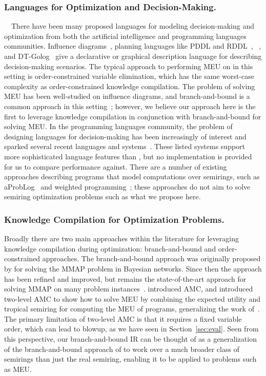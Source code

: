 \subsubsection*{Languages for Optimization and Decision-Making.}~~There have been many
proposed languages for modeling decision-making and optimization from both the
artificial intelligence and programming languages communities.
Influence
diagrams~\citep{khaled2013solving,maua2016equivalences},
planning languages like PDDL and RDDL~\citep{sanner2010relational},
\dtproblog{}~\citep{van2010dtproblog}, and DT-Golog~\citep{boutilierdecision} give
a declarative or graphical description language for describing decision-making
scenarios. The typical approach to performing MEU on in this setting is
order-constrained variable elimination, which has the same worst-case complexity
as order-constrained knowledge compilation.  The problem of solving MEU has been
well-studied on influence diagrams, and branch-and-bound is a common approach in
this setting~\citep{yuan2012solving}; however, we believe our approach here is
the first to leverage knowledge compilation in conjunction with branch-and-bound
for solving MEU.  In the programming languages community, the problem of
designing languages for decision-making has been increasingly of interest and
sparked several recent languages and
systems~\citep{abadi2021smart,lago2022reinforcement}. These listed systems
support more sophisticated language features than \dappl{}, but no
implementation is provided for us to compare performance against.  There are a
number of existing approaches describing programs that model computations over semirings, such as
aProbLog~\citep{kimmig2011algebraic,kimmig2017algebraic} and weighted
programming~\citep{batz2022weighted}; these approaches do not aim to solve
semiring optimization problems such as what we propose here.

\subsubsection*{Knowledge Compilation for Optimization Problems.}
Broadly there are two main approaches within the literature for leveraging
knowledge compilation during optimization: branch-and-bound and
order-constrained approaches. The branch-and-bound approach was
originally proposed by \citet{huang2006solving} for solving the MMAP
problem in Bayesian networks.  Since then the approach has been refined and
improved, but remains the state-of-the-art approach for solving
MMAP on many problem
instances~\citep{choi2022solving,conaty2017approximation}.
\citet{kimmig2011algebraic} introduced AMC, and
\citet{kiesel2022efficient} introduced two-level AMC
to show how to solve MEU by combining the
expected utility and tropical semiring
for computing the MEU of \dtproblog{} programs, generalizing the work of~\citet{derkinderen2020algebraic}.
The primary limitation of two-level AMC is that it requires a fixed
variable order, which can lead to blowup, as we have seen in Section~\ref{sec:eval}.
Seen from this perspective, our branch-and-bound IR can be thought of as a
generalization of the branch-and-bound approach of \citet{huang2006solving}
to work over a much broader class of semirings than just the real semiring,
enabling it to be applied to problems such as MEU.


